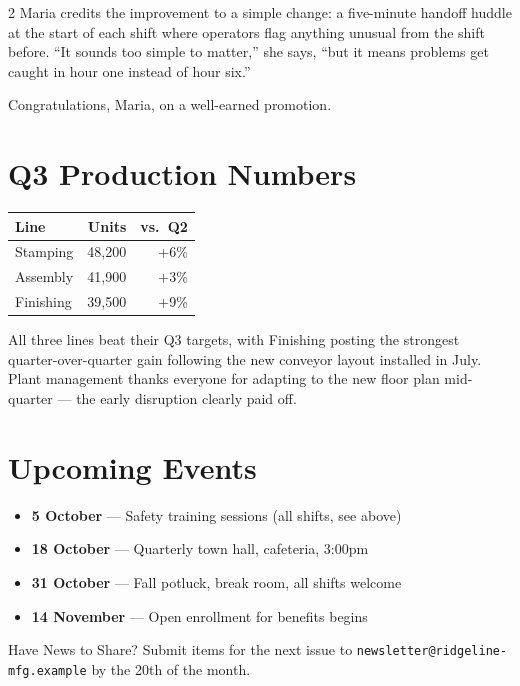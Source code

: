 \documentclass[10pt]{article}
\begin{document}
\begin{multicols}{2}
Maria credits the improvement to a simple change: a five-minute handoff
huddle at the start of each shift where operators flag anything unusual from
the shift before. ``It sounds too simple to matter,'' she says, ``but it
means problems get caught in hour one instead of hour six.''

Congratulations, Maria, on a well-earned promotion.

\columnbreak

\section*{Q3 Production Numbers}

\begin{center}
\begin{tabular}{lrr}
  \hline
  \textbf{Line} & \textbf{Units} & \textbf{vs.\ Q2} \\
  \hline
  Stamping   & 48{,}200 & +6\% \\
  Assembly   & 41{,}900 & +3\% \\
  Finishing  & 39{,}500 & +9\% \\
  \hline
\end{tabular}
\end{center}

All three lines beat their Q3 targets, with Finishing posting the strongest
quarter-over-quarter gain following the new conveyor layout installed in
July. Plant management thanks everyone for adapting to the new floor plan
mid-quarter --- the early disruption clearly paid off.

\section*{Upcoming Events}

\begin{itemize}
  \item \textbf{5 October} --- Safety training sessions (all shifts, see above)
  \item \textbf{18 October} --- Quarterly town hall, cafeteria, 3:00pm
  \item \textbf{31 October} --- Fall potluck, break room, all shifts welcome
  \item \textbf{14 November} --- Open enrollment for benefits begins
\end{itemize}

\begin{sidebox}{Have News to Share?}
  Submit items for the next issue to
  \texttt{newsletter@ridgeline-mfg.example} by the 20th of the month.
\end{sidebox}

\end{multicols}
\end{document}
